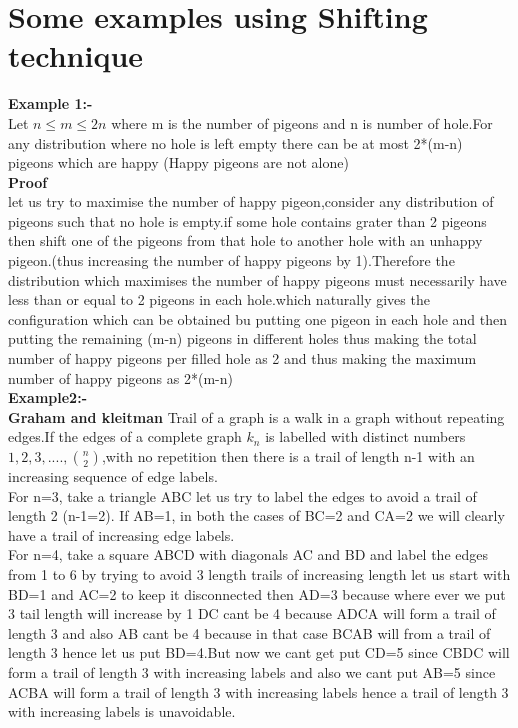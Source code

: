 \section{Some examples using Shifting technique}
\textbf{Example 1:-}\\
Let $n\leq m \leq 2n$ where m is the number of pigeons and n is number of hole.For any distribution where no hole is left empty there can be at most 2*(m-n) pigeons which are happy (Happy pigeons are not alone)\\
\textbf{Proof}\\
let us try to maximise the number of happy pigeon,consider any distribution of pigeons such that no hole is empty.if some hole contains grater than 2 pigeons then shift one of the pigeons from that hole to another hole with an unhappy pigeon.(thus increasing the number of happy pigeons by 1).Therefore the distribution which maximises the number of happy pigeons must necessarily have less than or equal to 2 pigeons in each hole.which  naturally gives the configuration which can be obtained bu putting one pigeon in each hole and then putting the remaining (m-n) pigeons in different holes thus making the total number of happy pigeons per filled hole as 2 and thus making the maximum number of happy pigeons as 2*(m-n)\\
\textbf{Example2:-}\\
\textbf{Graham and kleitman} Trail of a graph  is a walk in a graph without repeating edges.If the edges of a complete graph $k_n $ is labelled with distinct numbers ${1,2,3,....,{n\choose 2}}$,with no repetition then there is a trail of length n-1 with an increasing sequence of edge labels.\\
For n=3, take a triangle ABC  let us try to label the edges to avoid a trail of length 2 (n-1=2). If AB=1, in both the cases of BC=2 and CA=2 we will clearly have a trail of increasing edge labels.\\
For n=4, take a square ABCD with diagonals AC and BD and label the edges from 1 to 6 by trying to avoid 3 length trails of increasing length let us start with BD=1 and AC=2 to keep it disconnected then AD=3 because where ever we put 3 tail length will increase by 1 DC  cant be 4 because ADCA will form a trail of length 3 and also AB cant be 4 because in that case BCAB will from a trail of length 3 hence let us put BD=4.But now we cant get put CD=5 since CBDC will form a trail of length 3 with increasing labels  and also we cant put AB=5 since ACBA will form a trail of length 3 with increasing labels hence a trail of length 3 with  increasing labels is unavoidable.\\
